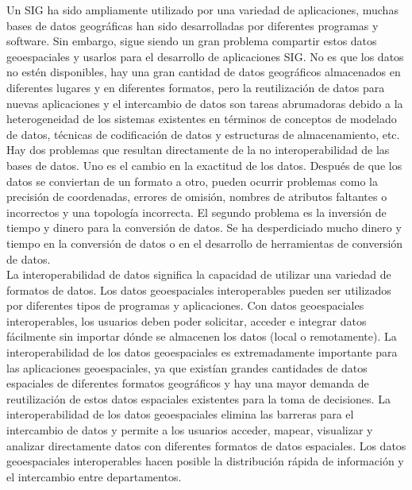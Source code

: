 





Un SIG ha sido ampliamente utilizado por una variedad de aplicaciones, muchas bases de datos geográficas han sido desarrolladas por diferentes programas y software. Sin embargo, sigue siendo un gran problema compartir estos datos geoespaciales y usarlos para el desarrollo de aplicaciones SIG. No es que los datos no estén disponibles, hay una gran cantidad de datos geográficos almacenados en diferentes lugares y en diferentes formatos, pero la reutilización de datos para nuevas aplicaciones y el intercambio de datos son tareas abrumadoras debido a la heterogeneidad de los sistemas existentes en términos de conceptos de modelado de datos, técnicas de codificación de datos y estructuras de almacenamiento, etc.\\

Hay dos problemas que resultan directamente de la no interoperabilidad de las bases de datos. Uno es el cambio en la exactitud de los datos. Después de que los datos se conviertan de un formato a otro, pueden ocurrir problemas como la precisión de coordenadas, errores de omisión, nombres de atributos faltantes o incorrectos y una topología incorrecta. El segundo problema es la inversión de tiempo y dinero para la conversión de datos. Se ha desperdiciado mucho dinero y tiempo en la conversión de datos o en el desarrollo de herramientas de conversión de datos.\\

La interoperabilidad de datos significa la capacidad de utilizar una variedad de formatos de datos. Los datos geoespaciales interoperables pueden ser utilizados por diferentes tipos de programas y aplicaciones. Con datos geoespaciales interoperables, los usuarios deben poder solicitar, acceder e integrar datos fácilmente sin importar dónde se almacenen los datos (local o remotamente). La interoperabilidad de los datos geoespaciales es extremadamente importante para las aplicaciones geoespaciales, ya que existían grandes cantidades de datos espaciales de diferentes formatos geográficos y hay una mayor demanda de reutilización de estos datos espaciales existentes para la toma de decisiones. La interoperabilidad de los datos geoespaciales elimina las barreras para el intercambio de datos y permite a los usuarios acceder, mapear, visualizar y analizar directamente datos con diferentes formatos de datos espaciales. Los datos geoespaciales interoperables hacen posible la distribución rápida de información y el intercambio entre departamentos.\\


